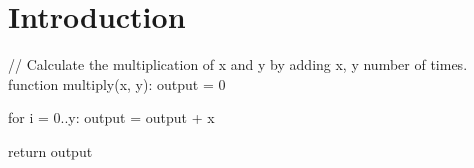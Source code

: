 \graphicspath{{./Figs/}}

\chapter{Introduction} 
\label{sec:intro}

\begin{python}[caption=Example computation]
// Calculate the multiplication of x and y by adding x, y number of times.
function multiply(x, y):
  output = 0

  for i = 0..y:
    output = output + x

  return output
\end{python}
